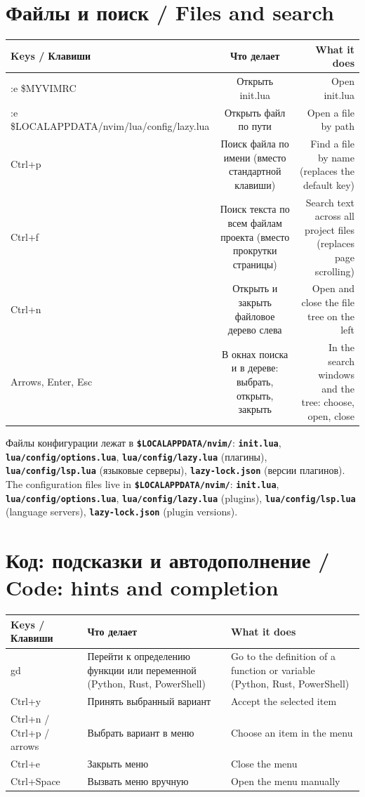 \documentclass[10pt]{article}
\newcommand{\RU}{\selectlanguage{russian}}
\newcommand{\EN}{\selectlanguage{english}}
\newcommand{\key}[1]{\texttt{\bfseries #1}}
\newcommand{\hdr}[3]{\toprule \textbf{#1} & \textbf{#2} & \textbf{#3} \\ \midrule \endhead}
\begin{document}
\section*{Файлы и поиск / Files and search}
\begin{longtable}{@{}L C D@{}}
\hdr{Keys / Клавиши}{Что делает}{What it does}
:e \$MYVIMRC & Открыть init.lua & Open init.lua \\
:e \$LOCALAPPDATA/nvim/lua/config/lazy.lua & Открыть файл по пути & Open a file by path \\
Ctrl+p & Поиск файла по имени (вместо стандартной клавиши) & Find a file by name (replaces the default key) \\
Ctrl+f & Поиск текста по всем файлам проекта (вместо прокрутки страницы) & Search text across all project files (replaces page scrolling) \\
Ctrl+n & Открыть и закрыть файловое дерево слева & Open and close the file tree on the left \\
Arrows, Enter, Esc & В окнах поиска и в дереве: выбрать, открыть, закрыть & In the search windows and the tree: choose, open, close \\
\end{longtable}

\begin{paracol}{2}
\RU
Файлы конфигурации лежат в \key{\$LOCALAPPDATA/nvim/}: \key{init.lua}, \key{lua/config/options.lua}, \key{lua/config/lazy.lua} (плагины), \key{lua/config/lsp.lua} (языковые серверы), \key{lazy-lock.json} (версии плагинов).
\switchcolumn
\EN
The configuration files live in \key{\$LOCALAPPDATA/nvim/}: \key{init.lua}, \key{lua/config/options.lua}, \key{lua/config/lazy.lua} (plugins), \key{lua/config/lsp.lua} (language servers), \key{lazy-lock.json} (plugin versions).
\end{paracol}

\section*{Код: подсказки и автодополнение / Code: hints and completion}
\begin{longtable}{@{}K A B@{}}
\hdr{Keys / Клавиши}{Что делает}{What it does}
gd & Перейти к определению функции или переменной (Python, Rust, PowerShell) & Go to the definition of a function or variable (Python, Rust, PowerShell) \\
Ctrl+y & Принять выбранный вариант & Accept the selected item \\
Ctrl+n / Ctrl+p / arrows & Выбрать вариант в меню & Choose an item in the menu \\
Ctrl+e & Закрыть меню & Close the menu \\
Ctrl+Space & Вызвать меню вручную & Open the menu manually \\
\end{longtable}
\end{document}
